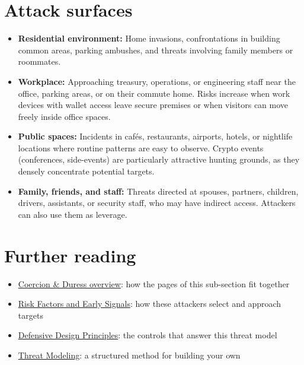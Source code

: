 \section{Attack surfaces}\label{attack-surfaces}

\begin{itemize}
\tightlist
\item
  \textbf{Residential environment:} Home invasions, confrontations in building common areas, parking ambushes, and threats involving family members or roommates.
\item
  \textbf{Workplace:} Approaching treasury, operations, or engineering staff near the office, parking areas, or on their commute home. Risks increase when work devices with wallet access leave secure premises or when visitors can move freely inside office spaces.
\item
  \textbf{Public spaces:} Incidents in cafés, restaurants, airports, hotels, or nightlife locations where routine patterns are easy to observe. Crypto events (conferences, side-events) are particularly attractive hunting grounds, as they densely concentrate potential targets.
\item
  \textbf{Family, friends, and staff:} Threats directed at spouses, partners, children, drivers, assistants, or security staff, who may have indirect access. Attackers can also use them as leverage.
\end{itemize}

\section{Further reading}\label{further-reading}

\begin{itemize}
\tightlist
\item
  \href{https://frameworks.securityalliance.dev/physical-security/coercion-and-duress/overview}{Coercion \& Duress overview}: how the pages of this sub-section fit together
\item
  \href{https://frameworks.securityalliance.dev/physical-security/coercion-and-duress/risk-factors-and-early-signals}{Risk Factors and Early Signals}: how these attackers select and approach targets
\item
  \href{https://frameworks.securityalliance.dev/physical-security/coercion-and-duress/defensive-design-principles}{Defensive Design Principles}: the controls that answer this threat model
\item
  \href{https://frameworks.securityalliance.dev/threat-modeling/overview}{Threat Modeling}: a structured method for building your own
\end{itemize}

